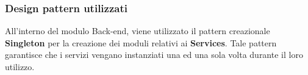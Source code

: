 \subsubsection{Design pattern utilizzati}
All'interno del modulo Back-end, viene utilizzato il pattern creazionale \textbf{Singleton} per la creazione dei moduli relativi ai \textbf{Services}. Tale pattern garantisce che i servizi vengano instanziati una ed una sola volta durante il loro utilizzo.